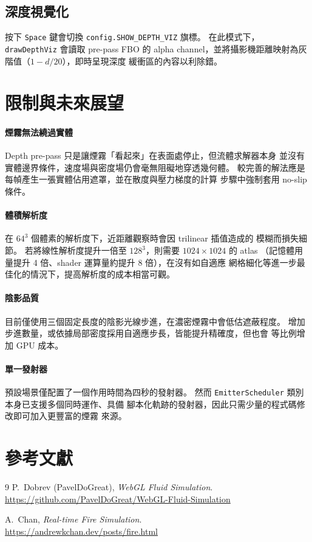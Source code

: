 \documentclass[a4paper, 12pt]{article}
\begin{document}
\subsection{深度視覺化}

按下 \texttt{Space} 鍵會切換 \texttt{config.SHOW\_DEPTH\_VIZ} 旗標。
在此模式下，\texttt{drawDepthViz} 會讀取 pre-pass FBO 的 alpha
channel，並將攝影機距離映射為灰階值（$1 - d/20$），即時呈現深度
緩衝區的內容以利除錯。

\section{限制與未來展望}

\paragraph{煙霧無法繞過實體}
Depth pre-pass 只是讓煙霧「看起來」在表面處停止，但流體求解器本身
並沒有實體邊界條件，速度場與密度場仍會毫無阻礙地穿透幾何體。
較完善的解法應是每幀產生一張實體佔用遮罩，並在散度與壓力梯度的計算
步驟中強制套用 no-slip 條件。

\paragraph{體積解析度}
在 $64^3$ 個體素的解析度下，近距離觀察時會因 trilinear 插值造成的
模糊而損失細節。
若將線性解析度提升一倍至 $128^3$，則需要 $1024\times1024$ 的 atlas
（記憶體用量提升 4 倍、shader 運算量約提升 8 倍），在沒有如自適應
網格細化等進一步最佳化的情況下，提高解析度的成本相當可觀。

\paragraph{陰影品質}
目前僅使用三個固定長度的陰影光線步進，在濃密煙霧中會低估遮蔽程度。
增加步進數量，或依據局部密度採用自適應步長，皆能提升精確度，但也會
等比例增加 GPU 成本。

\paragraph{單一發射器}
預設場景僅配置了一個作用時間為四秒的發射器。
然而 \texttt{EmitterScheduler} 類別本身已支援多個同時運作、具備
腳本化軌跡的發射器，因此只需少量的程式碼修改即可加入更豐富的煙霧
來源。

\section{參考文獻}

\begin{thebibliography}{9}
  P.\ Dobrev (PavelDoGreat),
  \textit{WebGL Fluid Simulation}.\\
  \url{https://github.com/PavelDoGreat/WebGL-Fluid-Simulation}

  A.\ Chan,
  \textit{Real-time Fire Simulation}.\\
  \url{https://andrewkchan.dev/posts/fire.html}
\end{thebibliography}
\end{document}
